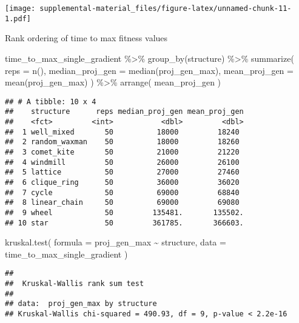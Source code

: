 \documentclass[
]{book}
\newenvironment{Shaded}{\begin{snugshade}}{\end{snugshade}}
\newcommand{\AttributeTok}[1]{\textcolor[rgb]{0.77,0.63,0.00}{#1}}
\newcommand{\FunctionTok}[1]{\textcolor[rgb]{0.00,0.00,0.00}{#1}}
\newcommand{\NormalTok}[1]{#1}
\newcommand{\SpecialCharTok}[1]{\textcolor[rgb]{0.00,0.00,0.00}{#1}}
\begin{document}
\texttt{[image: supplemental-material\_files/figure-latex/unnamed-chunk-11-1.pdf]}

Rank ordering of time to max fitness values

\begin{Shaded}
\begin{Highlighting}[]
\NormalTok{time\_to\_max\_single\_gradient }\SpecialCharTok{\%\textgreater{}\%}
  \FunctionTok{group\_by}\NormalTok{(structure) }\SpecialCharTok{\%\textgreater{}\%}
  \FunctionTok{summarize}\NormalTok{(}
    \AttributeTok{reps =} \FunctionTok{n}\NormalTok{(),}
    \AttributeTok{median\_proj\_gen =} \FunctionTok{median}\NormalTok{(proj\_gen\_max),}
    \AttributeTok{mean\_proj\_gen =} \FunctionTok{mean}\NormalTok{(proj\_gen\_max)}
\NormalTok{  ) }\SpecialCharTok{\%\textgreater{}\%}
  \FunctionTok{arrange}\NormalTok{(}
\NormalTok{    mean\_proj\_gen}
\NormalTok{  )}
\end{Highlighting}
\end{Shaded}

\begin{verbatim}
## # A tibble: 10 x 4
##    structure      reps median_proj_gen mean_proj_gen
##    <fct>         <int>           <dbl>         <dbl>
##  1 well_mixed       50          18000         18240 
##  2 random_waxman    50          18000         18260 
##  3 comet_kite       50          21000         21220 
##  4 windmill         50          26000         26100 
##  5 lattice          50          27000         27460 
##  6 clique_ring      50          36000         36020 
##  7 cycle            50          69000         68840 
##  8 linear_chain     50          69000         69080 
##  9 wheel            50         135481.       135502.
## 10 star             50         361785.       366603.
\end{verbatim}

\begin{Shaded}
\begin{Highlighting}[]
\FunctionTok{kruskal.test}\NormalTok{(}
  \AttributeTok{formula =}\NormalTok{ proj\_gen\_max }\SpecialCharTok{\textasciitilde{}}\NormalTok{ structure,}
  \AttributeTok{data =}\NormalTok{ time\_to\_max\_single\_gradient}
\NormalTok{)}
\end{Highlighting}
\end{Shaded}

\begin{verbatim}
## 
##  Kruskal-Wallis rank sum test
## 
## data:  proj_gen_max by structure
## Kruskal-Wallis chi-squared = 490.93, df = 9, p-value < 2.2e-16
\end{verbatim}
\end{document}

